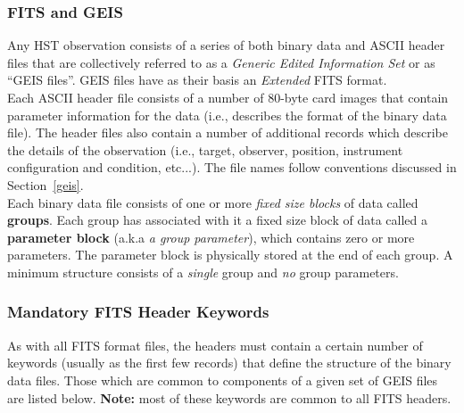 \subsubsection{\bf FITS and GEIS}
Any HST observation consists of a series of both binary data and ASCII
header files that are collectively referred to as a {\it Generic
Edited Information Set} or as ``GEIS files''.  GEIS files have as
their basis an {\it Extended} FITS format.\\

Each ASCII header file consists of a number of 80-byte card images 
that contain parameter information for the data (i.e., describes the format 
of the binary data file).  The header files also contain a number of 
additional records which describe the details of the observation (i.e., 
target, observer, position, instrument configuration and condition, etc...).  
The file names follow conventions discussed in Section~\ref{geis}.\\

Each binary data file consists of one or more {\it fixed size blocks} of data
called {\bf groups}.  Each group has associated with it a fixed size
block of data called a {\bf parameter block} (a.k.a {\it a group parameter}),
which contains zero or more parameters.  The parameter block is physically 
stored at the 
end of each group.  A minimum structure consists of a 
{\it single} group and {\it no} group parameters.

\subsubsection{\bf Mandatory FITS Header Keywords}
As with all FITS format files, the headers must contain a certain number of 
keywords (usually as the first few records) that define the structure of the 
binary data files.  Those which are common to components of a given set of 
GEIS files are listed below. {\bf Note:} most of these keywords are common 
to all FITS headers.

